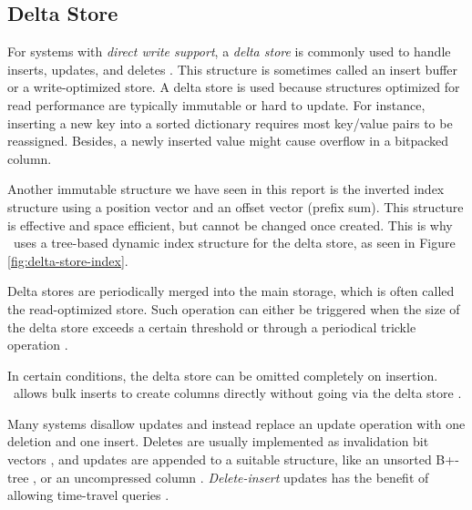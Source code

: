 \subsection{Delta Store}
\label{sub:Delta Store}

For systems with \textit{direct write support}, a \textit{delta store} is commonly used to handle inserts, updates, and deletes \cite{Raman2013-em, Stonebraker2005-qz}. This structure is sometimes called an insert buffer or a write-optimized store. A delta store is used because structures optimized for read performance are typically immutable or hard to update. For instance, inserting a new key into a sorted dictionary requires most key/value pairs to be reassigned. Besides, a newly inserted value might cause overflow in a bitpacked column.


Another immutable structure we have seen in this report is the inverted index structure using a position vector and an offset vector (prefix sum). This structure is effective and space efficient, but cannot be changed once created. This is why \hyrise~uses a tree-based dynamic index structure for the delta store, as seen in Figure \ref{fig:delta-store-index}.


Delta stores are periodically merged into the main storage, which is often called the read-optimized store. Such operation can either be triggered when the size of the delta store exceeds a certain threshold or through a periodical trickle operation \cite{Lahiri2015-mz, Farber2012-vh}.

In certain conditions, the delta store can be omitted completely on insertion. \mssql~allows bulk inserts to create columns directly without going via the delta store \cite{Larson2013-mc}.

Many systems disallow updates and instead replace an update operation with one deletion and one insert. Deletes are usually implemented as invalidation bit vectors \cite{Lamb2012-kg, Raman2013-em}, and updates are appended to a suitable structure, like an unsorted B+-tree \cite{Psaroudakis2014-ma}, or an uncompressed column \cite{Farber2012-vh}. \textit{Delete-insert} updates has the benefit of allowing time-travel queries \cite{Plattner2014-fr, Schwalb2014-hn}.

